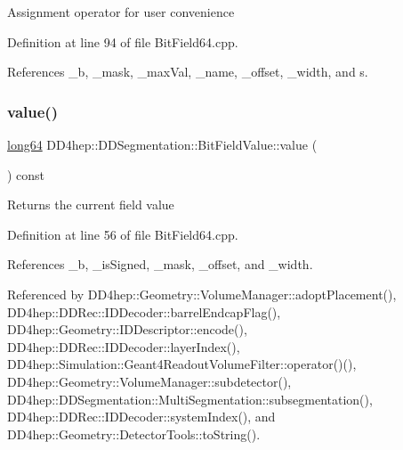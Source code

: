 Assignment operator for user convenience 

Definition at line 94 of file Bit\+Field64.\+cpp.



References \+\_\+b, \+\_\+mask, \+\_\+max\+Val, \+\_\+name, \+\_\+offset, \+\_\+width, and s.

\hypertarget{class_d_d4hep_1_1_d_d_segmentation_1_1_bit_field_value_a46fee9b58df6cfc614afdbf6e82e7e80}{}\label{class_d_d4hep_1_1_d_d_segmentation_1_1_bit_field_value_a46fee9b58df6cfc614afdbf6e82e7e80} 
\subsubsection{\texorpdfstring{value()}{value()}\hspace{0.1cm}{\footnotesize\ttfamily [1/2]}}
{\footnotesize\ttfamily \hyperlink{namespace_d_d4hep_ac2a70e722b33dc7ddaa20db8954ac836}{long64} D\+D4hep\+::\+D\+D\+Segmentation\+::\+Bit\+Field\+Value\+::value (\begin{DoxyParamCaption}{ }\end{DoxyParamCaption}) const}

Returns the current field value 

Definition at line 56 of file Bit\+Field64.\+cpp.



References \+\_\+b, \+\_\+is\+Signed, \+\_\+mask, \+\_\+offset, and \+\_\+width.



Referenced by D\+D4hep\+::\+Geometry\+::\+Volume\+Manager\+::adopt\+Placement(), D\+D4hep\+::\+D\+D\+Rec\+::\+I\+D\+Decoder\+::barrel\+Endcap\+Flag(), D\+D4hep\+::\+Geometry\+::\+I\+D\+Descriptor\+::encode(), D\+D4hep\+::\+D\+D\+Rec\+::\+I\+D\+Decoder\+::layer\+Index(), D\+D4hep\+::\+Simulation\+::\+Geant4\+Readout\+Volume\+Filter\+::operator()(), D\+D4hep\+::\+Geometry\+::\+Volume\+Manager\+::subdetector(), D\+D4hep\+::\+D\+D\+Segmentation\+::\+Multi\+Segmentation\+::subsegmentation(), D\+D4hep\+::\+D\+D\+Rec\+::\+I\+D\+Decoder\+::system\+Index(), and D\+D4hep\+::\+Geometry\+::\+Detector\+Tools\+::to\+String().

\hypertarget{class_d_d4hep_1_1_d_d_segmentation_1_1_bit_field_value_a0a5cb58e7b01918973a0768b766f9bb6}{}\label{class_d_d4hep_1_1_d_d_segmentation_1_1_bit_field_value_a0a5cb58e7b01918973a0768b766f9bb6} 
